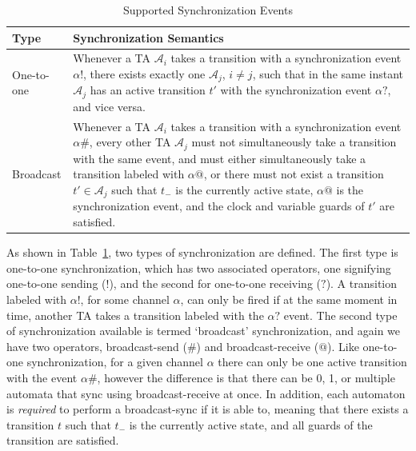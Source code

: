 \documentclass[a4paper,11pt]{report}
\theoremstyle{definition}
\begin{document}
\begin{table}
  \centering
  \begin{tabular}{l p{}}
    \textbf{Type} & \textbf{Synchronization Semantics} \\
    \midrule
    One-to-one & Whenever a TA $\mathcal{A}_{i}$ takes a transition with a
                 synchronization event $\alpha{!}$, there exists exactly one
                 $\mathcal{A}_{j}$, $i\neq j$, such that in the same instant
                 $\mathcal{A}_{j}$ has an active transition $t'$ with the
                 synchronization event $\alpha{?}$, and vice versa. \\
    \midrule
    Broadcast &  Whenever a TA $\mathcal{A}_{i}$ takes a transition with a
                synchronization event $\alpha\#$, every other TA
                $\mathcal{A}_{j}$ must not simultaneously take a transition with
                the same event, and must either simultaneously take a transition
                labeled with $\alpha @$, or there must not exist a transition
                $t' \in \mathcal{A}_{j}$ such that $t_{-}$ is the currently
                active state, $\alpha @$ is the synchronization event, and the
                clock and variable guards of $t'$ are satisfied.
    \\
    \midrule
  \end{tabular}
  \caption{Supported Synchronization Events}
  \label{table:sync-def}
\end{table}

As shown in Table~\ref{table:sync-def}, two types of synchronization are
defined. The first type is one-to-one synchronization, which has two associated
operators, one signifying one-to-one sending (${!}$), and the second for
one-to-one receiving (${?}$). A transition labeled with $\alpha{!}$, for some
channel $\alpha$, can only be fired if at the same moment in time, another TA
takes a transition labeled with the $\alpha{?}$ event. The second type of
synchronization available is termed `broadcast' synchronization, and again we
have two operators, broadcast-send ($\#$) and broadcast-receive (${@}$). Like
one-to-one synchronization, for a given channel $\alpha$ there can only be one
active transition with the event $\alpha\#$, however the difference is that
there can be 0, 1, or multiple automata that sync using broadcast-receive at
once. In addition, each automaton is \emph{required} to perform a broadcast-sync
if it is able to, meaning that there exists a transition $t$ such that $t_{-}$
is the currently active state, and all guards of the transition are satisfied.
\end{document}

